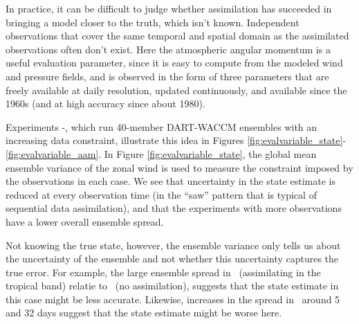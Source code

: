 In practice, it can be difficult to judge whether assimilation has succeeded in bringing a model closer to the truth, which isn't known. 
Independent observations that cover the same temporal and spatial domain as the assimilated observations often don't exist. 
Here the atmospheric angular momentum is a useful evaluation parameter, since it is easy to compute from the modeled wind and pressure fields, and is observed in the form of three parameters that are freely available at daily resolution, updated continuously, and available since the 1960s (and at high accuracy since about 1980).  

Experiments \WACCMNODA-\WACCMGLOBAL, which run 40-member DART-WACCM ensembles with an increasing data constraint, illustrate this idea in Figures \ref{fig:evalvariable_state}-\ref{fig:evalvariable_aam}.   
In Figure \ref{fig:evalvariable_state}, the global mean ensemble variance of the zonal wind is used to measure the constraint imposed by the observations in each case.
We see that uncertainty in the state estimate is reduced at every observation time (in the ``saw'' pattern that is typical of sequential data assimilation), and that the experiments with more observations have a lower overall ensemble spread. 

Not knowing the true state, however, the ensemble variance only tells us about the uncertainty of the ensemble and not whether this uncertainty captures the true error. 
For example, the large ensemble spread in \WACCMTROPICS~(assimilating in the tropical band) relatie to \WACCMNODA~(no assimilation), suggests that the state estimate in this case might be less accurate. 
Likewise, increases in the spread in \WACCMGLOBAL~around 5 and 32 days suggest that the state estimate might be worse here. 

